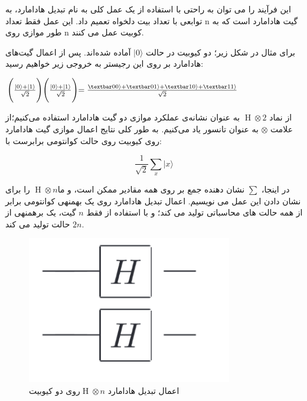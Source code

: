 \documentclass{book}
\begin{document}
این فرآیند را می توان به راحتی  با استفاده از یک عمل کلی به نام تبدیل هادامارد، به توابعی با تعداد بیت دلخواه تعمیم داد. این عمل فقط تعداد n گیت هادامارد است که به طور موازی روی n کوبیت عمل می کنند.

برای مثال در شکل زیر؛ دو کیوبیت در حالت $\vert 0 \rangle$ آماده شده‌‌اند. پس از اعمال گیت‌های هادامارد بر روی این رجیستر به خروجی زیر خواهیم رسید: 

\begin{center}
	$ \Biggl( \frac{\vert 0 \rangle + \vert 1 \rangle}{\sqrt{2}}\Biggl)\Biggl( \frac{\vert 0 \rangle + \vert 1 \rangle}{\sqrt{2}}\Biggl) = \frac{\textbar00\rangle + \textbar01\rangle + \textbar10\rangle + \textbar11\rangle}{\sqrt{2}}$

\end{center}

از نماد $\operatorname{H} \otimes 2$ به عنوان نشانه‌ی عملکرد موازی دو گیت هادامارد استفاده می‌کنیم؛از علامت $\otimes$ به عنوان تانسور یاد می‌کنیم. به طور کلی نتایج اعمال موازی گیت هادامارد روی  کیوبیت روی حالت کوانتومی برابرست با:

\begin{center}
	\[\frac{1}{\sqrt{2}} \sum_{x} \vert x \rangle\]
\end{center}


در اینجا، $\sum$ نشان دهنده جمع بر روی همه مقادیر ممکن  است، و ما$\operatorname{H} \otimes n$  را برای نشان دادن این عمل می نویسیم.
اعمال تبدیل هادامارد روی یک بهمنهی کوانتومی برابر از همه حالت های محاسباتی تولید می کند؛ و با استفاده از فقط $n$ گیت، یک برهمنهی از $2n$ حالت تولید می کند.
\begin{center}
	\begin{figure}[ht]
		\centering
		\includegraphics[width=0.8\textwidth]{Multyhadamard.png}
		\caption{اعمال تبدیل هادامارد $\operatorname{H} \otimes n$روی دو کیوبیت}
	\end{figure}
\end{center}
\end{document}
